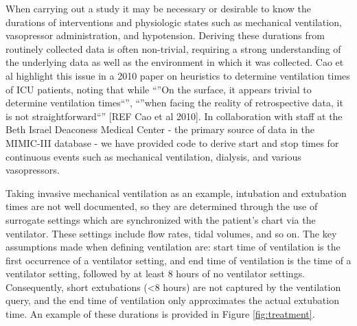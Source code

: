 \documentclass{elsart}
\begin{document}




When carrying out a study it may be necessary or desirable to know the durations of interventions and physiologic states such as mechanical ventilation, vasopressor administration, and hypotension. Deriving these durations from routinely collected data is often non-trivial, requiring a strong understanding of the underlying data as well as the environment in which it was collected. Cao et al highlight this issue in a 2010 paper on heuristics to determine ventilation times of ICU patients, noting that while ``''On the surface, it appears trivial to determine ventilation times``'', ``''when facing the reality of retrospective data, it is not straightforward``'' [REF Cao et al 2010]. In collaboration with staff at the Beth Israel Deaconess Medical Center - the primary source of data in the MIMIC-III database - we have provided code to derive start and stop times for continuous events such as mechanical ventilation, dialysis, and various vasopressors.

Taking invasive mechanical ventilation as an example, intubation and extubation times are not well documented, so they are determined through the use of surrogate settings which are synchronized with the patient's chart via the ventilator. These settings include flow rates, tidal volumes, and so on. The key assumptions made when defining ventilation are: start time of ventilation is the first occurrence of a ventilator setting, and end time of ventilation is the time of a ventilator setting, followed by at least 8 hours of no ventilator settings. Consequently, short extubations (<8 hours) are not captured by the ventilation query, and the end time of ventilation only approximates the actual extubation time. An example of these durations is provided in Figure \ref{fig:treatment}.
\end{document}

